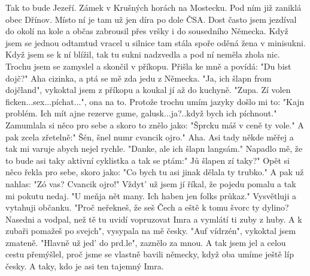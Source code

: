 
Tak to bude Jezeří. Zámek v Krušných horách na Mostecku. Pod ním již
zaniklá obec Dřínov. Místo ní je tam už jen díra po dole ČSA. Dost
často jsem jezdíval do okolí na kole a občas zabrousil přes vršky i do
sousedního Německa. Když jsem se jednou odtamtud vracel u silnice tam
stála spoře oděná žena v minisukni. Když jsem se k ní blížil, tak tu
sukni nadzvedla a pod ní neměla zhola nic. Trochu jsem se zamyslel a
skončil v příkopu. Přišla ke mně a povídá: "Du bist dojč?" Aha
cizinka, a ptá se mě zda jedu z Německa. "Ja, ich šlapn from
dojčland", vykoktal jsem z příkopu a koukal jí až do kuchyně. "Zupa.
Zí volen ficken...sex...píchat...", ona na to. Protože trochu umím
jazyky došlo mi to: "Kajn problém. Ich mít ajne rezerve gume,
galusk...ja?..když bych ich píchnout." Zamumlala si něco pro sebe a
skoro to znělo jako: "Šprcku máš v ceně ty vole." A pak zcela
zřetelně:" Šén, šnel numr cvancik ojro." Aha. Asi tady někde měřej a
tak mi varuje abych nejel rychle. "Danke, ale ich šlapn langsám."
Napadlo mě, že to bude asi taky aktivní cyklistka a tak se ptám:" Jů
šlapen zí taky?" Opět si něco řekla pro sebe, skoro jako: "Co bych tu
asi jinak dělala ty trubko." A pak už nahlas: "Zó vas? Cvancik ojro!"
Vždyt' už jsem jí říkal, že pojedu pomalu a tak mi pokutu nedaj. "U
meňja nět many. Ich haben jen folks průkaz." Vysvětluji a vytahuji
občanku. "Proč neřekneš, že seš Čech a eště k tomu švorc ty dylino?
Nasedni a vodpal, než tě tu uvidí vopruzovat Imra a vymlátí ti zuby z
huby. A k zubaři pomažeš po svejch", vysypala na mě česky. "Auf
vídrzén", vykoktal jsem zmateně. "Hlavně už jed' do prd.le", zaznělo
za mnou. A tak jsem jel a celou cestu přemýšlel, proč jsme se vlastně
bavili německy, když oba umíme ještě líp česky. A taky, kdo je asi ten
tajemný Imra.


